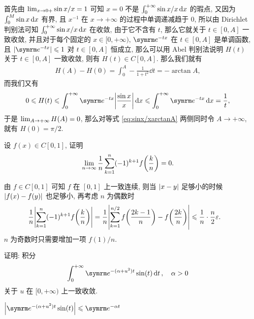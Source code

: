 \begin{exercise}[series=exer]
\begin{answer}
    首先由 $ \lim_{x \to 0+}\sin x/x = 1 $ 可知 $ x = 0 $ 不是 $ \int_{0}^{+\infty}\sin x/x \dx* $ 的瑕点, 又因为 $ \int_{0}^{M}\sin x\dx* $ 有界, 且 $ x^{-1} $ 在 $ x \to +\infty $ 的过程中单调递减趋于 $ 0 $, 所以由 Dirichlet 判别法可知 $ \int_{0}^{+\infty} \sin x/x \dx* $ 在收敛, 由于它不含有 $ t $, 那么它就关于 $ t\in [0, A] $ 一致收敛, 并且对于每个固定的 $ x \in [0, +\infty) $, $ \me^{-tx} $ 在 $ t\in[0, A] $ 是单调函数, 且 $ \abs{\me^{-tx}} \le 1 $ 对 $ t \in [0, A] $ 恒成立, 那么可以用 Abel 判别法说明 $ H(t) $ 关于 $ t \in [0, A] $ 一致收敛, 则有 $ H(t) \in C[0, A] $. 那么我们就有
    \begin{align}\label{eq:sinx/xarctanA}
      H(A) - H(0) = \int_{0}^{A} -\frac{1}{1 + t^{2}} \dd{t} = -\arctan A,
    \end{align}
    而我们又有
    \begin{align*}
      0 \le H(t) \le \int_{0}^{+\infty} \me^{-tx}\abs{\frac{\sin x}{x}} \dx* \le \int_{0}^{+\infty} \me^{-tx} \dx* = \frac{1}{t},
    \end{align*}
    于是 $ \lim_{A \to +\infty} H(A) = 0 $, 那么对等式 \eqref{eq:sinx/xarctanA} 两侧同时令 $ A \to +\infty $, 就有 $ H(0) = \pi/2 $.
  \end{answer}
  \item 设 $ f(x) \in C[0, 1] $, 证明
  \begin{align*}
      \lim_{n \to \infty} \frac{1}{n} \sum_{k=1}^{n} (-1)^{k+1} f\qty(\frac{k}{n}) = 0.
  \end{align*}
  \begin{hint}
      由 $ f \in C[0, 1] $ 可知 $ f $ 在 $ [0, 1] $ 上一致连续, 则当 $ \abs{x - y} $ 足够小的时候 $ \abs{f(x) - f(y)} $ 也足够小, 再考虑 $ n $ 为偶数时
      \begin{align*}
          \frac{1}{n} \abs{\sum_{k=1}^{n} (-1)^{k+1} f\qty(\frac{k}{n})} & = \frac{1}{n}\abs{\sum_{k = 1}^{n/2}f\qty(\frac{2k-1}{n}) - f\qty(\frac{2k}{n})} \leqslant \frac{1}{n}\cdot\frac{n}{2}\varepsilon.
      \end{align*}
      $ n $ 为奇数时只需要增加一项 $ f(1)/n $.
  \end{hint}
  \item 证明: 积分
  \begin{align*}
      \int_{0}^{+\infty} \me^{-(\alpha + u^{2})t} \sin(t) \dd{t},\quad \alpha > 0
  \end{align*}
  关于 $ u $ 在 $ [0, +\infty) $ 上一致收敛.
  \begin{hint}
      $ \abs{\me^{-(\alpha + u^{2})t} \sin(t)} \le \me^{-\alpha t} $
  \end{hint}

\end{exercise}
